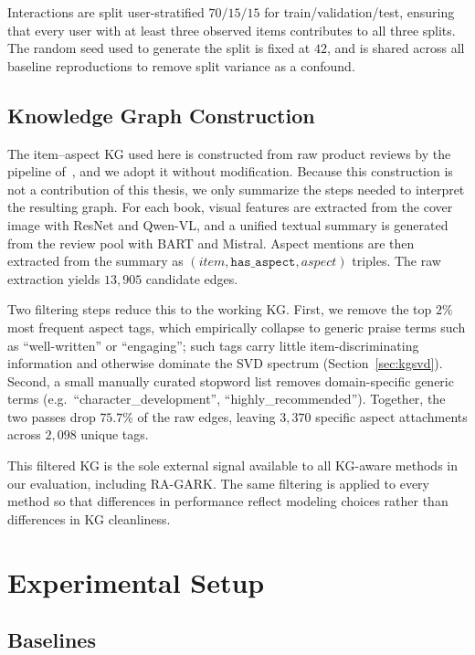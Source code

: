 Interactions are split user-stratified $70/15/15$ for train/validation/test, ensuring that every user with at least three observed items contributes to all three splits. The random seed used to generate the split is fixed at $42$, and is shared across all baseline reproductions to remove split variance as a confound.

\subsection{Knowledge Graph Construction}
\label{sec:eval-dataset-kg}

The item--aspect KG used here is constructed from raw product reviews by the pipeline of~\cite{ho2024reviewkg}, and we adopt it without modification. Because this construction is not a contribution of this thesis, we only summarize the steps needed to interpret the resulting graph. For each book, visual features are extracted from the cover image with ResNet and Qwen-VL, and a unified textual summary is generated from the review pool with BART and Mistral. Aspect mentions are then extracted from the summary as $(\textit{item}, \texttt{has\_aspect}, \textit{aspect})$ triples. The raw extraction yields $13{,}905$ candidate edges.

Two filtering steps reduce this to the working KG. First, we remove the top $2\%$ most frequent aspect tags, which empirically collapse to generic praise terms such as ``well-written'' or ``engaging''; such tags carry little item-discriminating information and otherwise dominate the SVD spectrum (Section~\ref{sec:kgsvd}). Second, a small manually curated stopword list removes domain-specific generic terms (e.g.\ ``character\_development'', ``highly\_recommended''). Together, the two passes drop $75.7\%$ of the raw edges, leaving $3{,}370$ specific aspect attachments across $2{,}098$ unique tags.

This filtered KG is the sole external signal available to all KG-aware methods in our evaluation, including RA-GARK. The same filtering is applied to every method so that differences in performance reflect modeling choices rather than differences in KG cleanliness.

\section{Experimental Setup}
\label{sec:eval-setup}

\subsection{Baselines}
\label{sec:eval-baselines}

